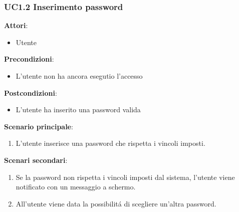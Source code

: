 \subsubsection{UC1.2 Inserimento password}\label{usecase:1_2}
\textbf{Attori}:
\begin{itemize}
    \item Utente
\end{itemize}
\textbf{Precondizioni}:
\begin{itemize}
    \item L'utente non ha ancora esegutio l'accesso
\end{itemize}
\textbf{Postcondizioni}:
\begin{itemize}
    \item L'utente ha inserito una password valida
\end{itemize}
\textbf{Scenario principale}:
\begin{enumerate}
    \item L'utente inserisce una password che rispetta i vincoli imposti.
\end{enumerate}
\textbf{Scenari secondari}:
\begin{enumerate}
    \item Se la password non rispetta i vincoli imposti dal sistema, l'utente viene notificato con un messaggio a schermo.
    \item All'utente viene data la possibilitá di scegliere un'altra password.
\end{enumerate}         